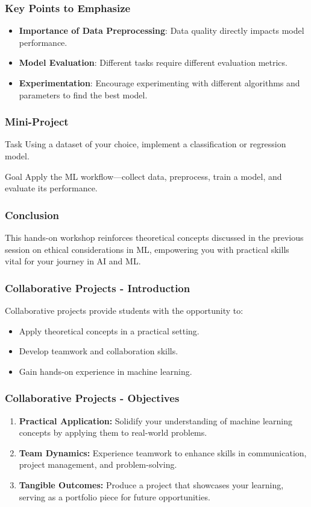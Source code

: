 \documentclass{beamer}
\begin{document}
\begin{frame}[fragile]
    \frametitle{Key Points to Emphasize}
    \begin{itemize}
        \item \textbf{Importance of Data Preprocessing}: Data quality directly impacts model performance.
        \item \textbf{Model Evaluation}: Different tasks require different evaluation metrics.
        \item \textbf{Experimentation}: Encourage experimenting with different algorithms and parameters to find the best model.
    \end{itemize}
\end{frame}

\begin{frame}[fragile]
    \frametitle{Mini-Project}
    \begin{block}{Task}
        Using a dataset of your choice, implement a classification or regression model.
    \end{block}
    
    \begin{block}{Goal}
        Apply the ML workflow—collect data, preprocess, train a model, and evaluate its performance.
    \end{block}
\end{frame}

\begin{frame}[fragile]
    \frametitle{Conclusion}
    This hands-on workshop reinforces theoretical concepts discussed in the previous session on ethical considerations in ML, empowering you with practical skills vital for your journey in AI and ML.
\end{frame}

\begin{frame}[fragile]
    \frametitle{Collaborative Projects - Introduction}
    Collaborative projects provide students with the opportunity to:
    \begin{itemize}
        \item Apply theoretical concepts in a practical setting.
        \item Develop teamwork and collaboration skills.
        \item Gain hands-on experience in machine learning.
    \end{itemize}
\end{frame}

\begin{frame}[fragile]
    \frametitle{Collaborative Projects - Objectives}
    \begin{enumerate}
        \item \textbf{Practical Application:} Solidify your understanding of machine learning concepts by applying them to real-world problems.
        \item \textbf{Team Dynamics:} Experience teamwork to enhance skills in communication, project management, and problem-solving.
        \item \textbf{Tangible Outcomes:} Produce a project that showcases your learning, serving as a portfolio piece for future opportunities.
    \end{enumerate}
\end{frame}
\end{document}
